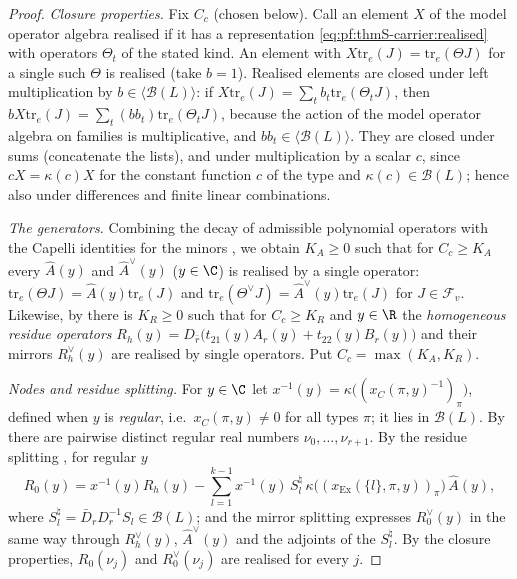 \begin{proof}
\emph{Closure properties.} Fix $C_c$ (chosen below). Call an element $X$ of the model operator algebra realised if it has a
representation \eqref{eq:pf:thmS-carrier:realised} with operators $\Theta_t$ of the stated kind. An element with
$X\mathrm{tr}_e(J)=\mathrm{tr}_e(\Theta J)$ for a single such $\Theta$ is realised (take $b=1$). Realised elements are closed
under left multiplication by $b\in\langle\mathcal B(L)\rangle$: if $X\mathrm{tr}_e(J)=\sum_tb_t\mathrm{tr}_e(\Theta_tJ)$, then
$bX\mathrm{tr}_e(J)=\sum_t(bb_t)\mathrm{tr}_e(\Theta_tJ)$, because the action of the model operator algebra on families is
multiplicative, and $bb_t\in\langle\mathcal B(L)\rangle$. They are closed under sums (concatenate the lists), and under
multiplication by a scalar $c$, since $cX=\kappa(c)X$ for the constant function $c$ of the type and $\kappa(c)\in\mathcal
B(L)$; hence also under differences and finite linear combinations.

\emph{The generators.} Combining the decay of admissible polynomial operators
 with the Capelli identities for the minors
, we obtain $K_A\ge0$ such that for $C_c\ge K_A$
every $\widehat A(y)$ and $\widehat A^\vee(y)$ ($y\in\C$) is realised by a single operator:
$\mathrm{tr}_e(\Theta J)=\widehat A(y)\mathrm{tr}_e(J)$ and $\mathrm{tr}_e(\Theta^\vee J)=\widehat A^\vee(y)\mathrm{tr}_e(J)$ for
$J\in\mathcal F_v$. Likewise, by  there is $K_R\ge0$ such
that for $C_c\ge K_R$ and $y\in\R$ the \emph{homogeneous residue operators}
$R_h(y)=D_{\bar r}\bigl(t_{21}(y)A_r(y)+t_{22}(y)B_r(y)\bigr)$ and their mirrors $R_h^\vee(y)$ are realised by single
operators. Put $C_c=\max(K_A,K_R)$.

\emph{Nodes and residue splitting.} For $y\in\C$ let $x^{-1}(y)=\kappa\bigl((x_C(\pi,y)^{-1})_\pi\bigr)$, defined when $y$ is
\emph{regular}, i.e.\ $x_C(\pi,y)\ne0$ for all types $\pi$; it lies in $\mathcal B(L)$. By
 there are pairwise distinct regular real numbers
$\nu_0,\dots,\nu_{r+1}$. By the residue splitting , for
regular $y$
\[
R_0(y)=x^{-1}(y)R_h(y)-\sum_{l=1}^{k-1}x^{-1}(y)\,S^\natural_l\,\kappa\bigl((x_{\mathrm{Ex}}(\{l\},\pi,y))_\pi\bigr)\,
\widehat A(y),
\]
where $S^\natural_l=\bar D_rD_r^{-1}S_l\in\mathcal B(L)$; and the mirror splitting
 expresses $R_0^\vee(y)$ in the same way through
$R_h^\vee(y)$, $\widehat A^\vee(y)$ and the adjoints of the $S^\natural_l$. By the closure properties, $R_0(\nu_j)$ and
$R_0^\vee(\nu_j)$ are realised for every $j$.


\end{proof}
